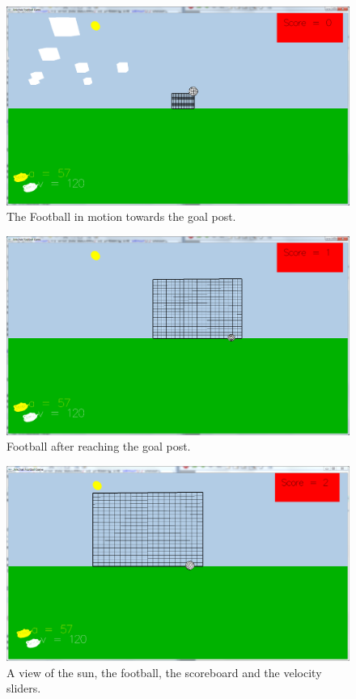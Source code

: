 \documentclass[12pt]{article} %
\begin{document}
\begin{figure}[h!]
  
  \centering
    \includegraphics[scale=0.35]{ball_in_motion.png}
\caption{The Football in motion towards the goal post.}
\end{figure}

\begin{figure}[h!]
  
  \centering
    \includegraphics[scale=0.35]{ball_in_gpost.png}
\caption{Football after reaching the goal post.}
\end{figure}
\begin{figure}[h!]
  
  \centering
    \includegraphics[scale=0.35]{final_position.png}
\caption{A view of the sun, the football, the scoreboard and the velocity sliders.}
\end{figure}
\newpage
\end{document}
